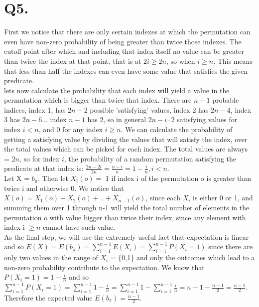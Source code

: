 \documentclass{report}
\begin{document}
\section*{Q5.}
First we notice that there are only certain indexes at which the permutation can even have non-zero probability of being greater than twice those indexes. The cutoff point after which  and including that index itself no value can be greater than twice the index at that point, that is at $2i \geq 2n$, so when $i \geq n$. This means that less than half the indexes can even have some value that satisfies the given predicate.\\ 
lets now calculate the probability that each index will yield a value in the permutation which is bigger than twice that index. There are $n-1$ probable indices, index 1, has $2n - 2$ possible 'satisfying' values, index 2 has $2n - 4$, index 3 has $2n - 6$... index $n-1$ has $2$, so in general $2n - i\cdot2$ satisfying values for index $i < n$, and $0$ for any index $i \geq n$. We can calculate the probability of getting a satisfying value by dividing the values that will satisfy the index, over the total values which can be picked for each index. The total values are always = $2n$, so for index $i$, the probability of a random permutation satisfying the predicate at that index is: $\frac{2n - 2i}{2n} = \frac{n - i}{n} = 1 - \frac{i}{n}, i < n$.\\
Let X = $b_{\pi}$. Then let $X_{i}(o) = $ 1 if index i of the permutation o is greater than twice i and otherwise 0. We notice that $X(o) = X_{1}(o) + X_{2}(o) + .. + X_{n-1}(o)$, since each $X_{i}$ is either 0 or 1, and summing them over 1 through n-1  will yield the total number of elements in the permutation o with value bigger than twice their index, since any element with index i $\geq n$ cannot have such value.\\ \break
As the final step, we will use the extremely useful fact that expectation is linear and so $E(X) = E(b_{\pi}) = \sum_{i = 1}^{n-1} E(X_{i}) = \sum_{i = 1}^{n-1} P(X_{i} = 1)$ since there are only two values in the range of $X_{i}$ = \{0,1\} and only the outcomes which lead to a non-zero probability contribute to the expectation. We know that $P(X_{i} = 1) = 1 - \frac{i}{n}$ and so $\sum_{i = 1}^{n-1} P(X_{i} = 1) = \sum_{i = 1}^{n-1}  1 - \frac{i}{n} = \sum_{i = 1}^{n-1} 1  - \sum_{i = 1}^{n-1} \frac{i}{n} = n-1 - \frac{n-1}{2} = \frac{n-1}{2}$.\\ \break
Therefore the expected value $E(b_{\pi}) = \frac{n-1}{2}$.
\end{document}
